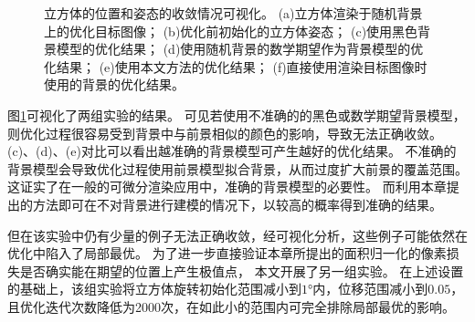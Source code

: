 \begin{figure}
    \caption[立方体的位置和姿态的收敛情况可视化]{
        立方体的位置和姿态的收敛情况可视化。
        (a)立方体渲染于随机背景上的优化目标图像；
        (b)优化前初始化的立方体姿态；
        (c)使用黑色背景模型的优化结果；
        (d)使用随机背景的数学期望作为背景模型的优化结果；
        (e)使用本文方法的优化结果；
        (f)直接使用渲染目标图像时使用的背景的优化结果。
    }
    \label{fig:cube_opt_vis}
\end{figure}
图\ref{fig:cube_opt_vis}可视化了两组实验的结果。
可见若使用不准确的的黑色或数学期望背景模型，则优化过程很容易受到背景中与前景相似的颜色的影响，导致无法正确收敛。
(c)、(d)、(e)对比可以看出越准确的背景模型可产生越好的优化结果。
不准确的背景模型会导致优化过程使用前景模型拟合背景，从而过度扩大前景的覆盖范围。
这证实了在一般的可微分渲染应用中，准确的背景模型的必要性。
而利用本章提出的方法即可在不对背景进行建模的情况下，以较高的概率得到准确的结果。

但在该实验中仍有少量的例子无法正确收敛，经可视化分析，这些例子可能依然在优化中陷入了局部最优。
为了进一步直接验证本章所提出的面积归一化的像素损失是否确实能在期望的位置上产生极值点，
本文开展了另一组实验。
在上述设置的基础上，该组实验将立方体旋转初始化范围减小到$1°$内，位移范围减小到$0.05$，且优化迭代次数降低为2000次，在如此小的范围内可完全排除局部最优的影响。

